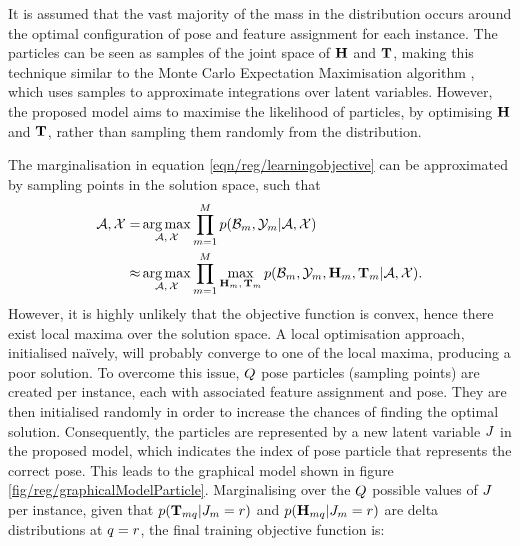 It is assumed that the vast majority of the mass in the distribution occurs around the optimal configuration of pose and feature assignment for each instance. The particles can be seen as samples of the joint space of $\mathbf{H}$ and $\mathbf{T}$, making this technique similar to the Monte Carlo Expectation Maximisation algorithm \cite{Levine2001, Wei1990}, which uses samples to approximate integrations over latent variables. However, the proposed model aims to maximise the likelihood of particles, by optimising $\mathbf{H}$ and $\mathbf{T}$, rather than sampling them randomly from the distribution. 

The marginalisation in equation \ref{eqn/reg/learningobjective} can be approximated by sampling points in the solution space, such that 
\begin{equation}
	\begin{aligned}
		\mathcal{A},\mathcal{X} = & \operatorname*{arg\,max}_{\mathcal{A},\,\mathcal{X}}
		\displaystyle\prod_{m=1}^M
		p(\mathcal{B}_m,\mathcal{Y}_m|\mathcal{A},\mathcal{X}) \\ 
		\approx &  
		\operatorname*{arg\,max}_{\mathcal{A},\,\mathcal{X}}
		\displaystyle\prod_{m=1}^M
		\max_{\mathbf{H}_m,\,\mathbf{T}_m}
		p(\mathcal{B}_m,\mathcal{Y}_m,\mathbf{H}_m,\mathbf{T}_m|\mathcal{A},\mathcal{X}).
	\end{aligned}
	\label{eqn/reg/approximatemaximumpose}
\end{equation}
However, it is highly unlikely that the objective function is convex, hence there exist local maxima over the solution space. A local optimisation approach, initialised na\"{i}vely, will probably converge to one of the local maxima, producing a poor solution. 
To overcome this issue, $Q$ pose particles (sampling points) are created per instance, each with associated feature assignment and pose. They are then initialised randomly in order to increase the chances of finding the optimal solution. 
Consequently, the particles are represented by a new latent variable ${J}$ in the proposed model, which indicates the index of pose particle that represents the correct pose. This leads to the graphical model shown in figure \ref{fig/reg/graphicalModelParticle}. Marginalising over the $Q$ possible values of ${J}$ per instance, given that 
$p(\mathbf{T}_{mq}|{J}_{m}  =  r)$ and $p(\mathbf{H}_{mq}|{J}_{m}  =  r)$ are delta distributions at $q=r$, the final training objective function is: 
